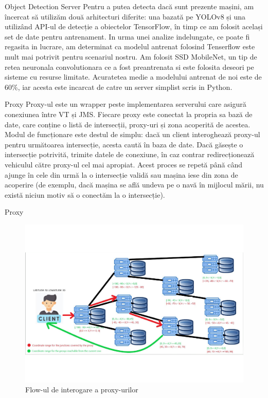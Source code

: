 \documentclass{beamer}
\begin{document}
    \begin{frame}{Object Detection Server}
        Pentru a putea detecta dacă sunt prezente mașini, am încercat
        să utilizăm două arhitecturi diferite: una bazată pe YOLOv8 și
        una utilizând API-ul de detecție a obiectelor TensorFlow, în
        timp ce am folosit același set de date pentru antrenament.
        In urma unei analize indelungate, ce poate fi regasita in lucrare, 
        am determinat ca modelul antrenat folosind Tenserflow este mult 
        mai potrivit pentru scenariul nostru. Am folosit SSD MobileNet, un 
        tip de retea neuronala convolutionara ce a fost preantrenata si 
        este folosita deseori pe sisteme cu resurse limitate. Acuratetea medie 
        a modelului antrenat de noi este de 60\%, iar acesta este incarcat de 
        catre un server simplist scris in Python.
    \end{frame}

    \begin{frame}{Proxy}
        Proxy-ul este un wrapper peste implementarea serverului care
        asigură conexiunea între VT și JMS.
        Fiecare proxy este conectat la propria sa bază de date,
        care conține o listă de intersecții, proxy-uri și zona acoperită
        de acestea. Modul de funcționare este destul de simplu: dacă un
        client interoghează proxy-ul pentru următoarea intersecție,
        acesta caută în baza de date. Dacă găsește o intersecție
        potrivită, trimite datele de conexiune, în caz contrar
        redirecționează vehiculul către proxy-ul cel mai apropiat.
        Acest proces se repetă până când ajunge în cele din urmă la o
        intersecție validă sau mașina iese din zona de acoperire
        (de exemplu, dacă mașina se află undeva pe o navă în mijlocul
        mării, nu există niciun motiv să o conectăm la o intersecție).
    \end{frame}
    \begin{frame}{Proxy}
        \begin{figure}[h!]
            \includegraphics[width=(\textwidth / 6) * 5]{Sketches/ProxyFlowV2.png}
            \caption{Flow-ul de interogare a proxy-urilor}
            \label{fig:Proxy querys flow}
        \end{figure}
    \end{frame}
\end{document}
